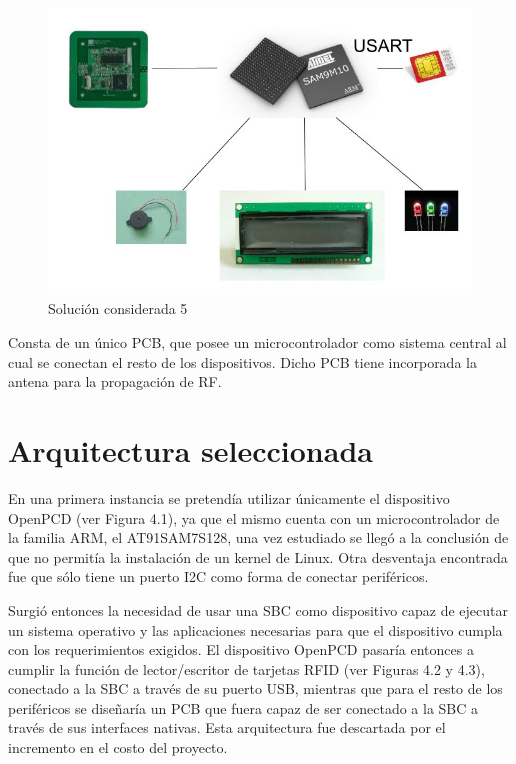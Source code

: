 \begin{itemize}
\begin{figure}[H]
\centering
  \begin{center}
  \includegraphics[scale=.25]{Imagenes/4.jpg} 
  \end{center}
  \caption{Solución considerada 5}\label{Fig:HW5} 
\end{figure}

Consta de un único PCB, que posee un microcontrolador como sistema central al cual se
conectan el resto de los dispositivos. Dicho PCB tiene incorporada la antena para la
propagación de RF.

\end{itemize}

\section{Arquitectura seleccionada}
En una primera instancia se pretendía utilizar únicamente el dispositivo OpenPCD (ver Figura 4.1), ya que el mismo cuenta con un microcontrolador de la familia ARM, el AT91SAM7S128, una vez estudiado se llegó a la conclusión de que no permitía la instalación de un kernel de Linux. Otra desventaja encontrada fue que sólo tiene un puerto I2C como forma de conectar periféricos.

Surgió entonces la necesidad de usar una SBC como dispositivo capaz de ejecutar un sistema operativo y las aplicaciones necesarias para que el dispositivo cumpla con los requerimientos exigidos. El dispositivo OpenPCD pasaría entonces a cumplir la función de lector/escritor de tarjetas RFID (ver Figuras 4.2 y 4.3), conectado a la SBC a través de su puerto USB, mientras que para el resto de los periféricos se diseñaría un PCB que fuera capaz de ser conectado a la SBC a través de sus interfaces nativas. Esta arquitectura fue descartada por el incremento en el costo del proyecto.

